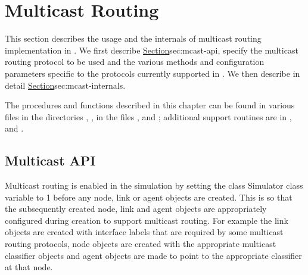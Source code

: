 \chapter{Multicast Routing}
\label{chap:multicast}

This section describes the usage and the internals of multicast
routing implementation in \ns.
We first describe 
\href{the user interface to enable multicast routing}{Section}{sec:mcast-api},
specify the multicast routing protocol to be used and the
various methods and configuration parameters specific to the
protocols currently supported in \ns.
We then describe in detail 
\href{the internals and the architecture of the
multicast routing implementation in \ns}{Section}{sec:mcast-internals}.

The procedures and functions described in this chapter can be found in
various files in the directories , ,
in the files , and ;
additional support routines
are in , and .

\section{Multicast API}
\label{sec:mcast-api}

Multicast routing is enabled in the simulation by setting 
the class Simulator class variable  to 1
before any node, link or agent objects are created.
This is so that the subsequently created 
node, link and agent objects are appropriately
configured during creation to support multicast routing.
For example the link objects are created with interface labels that
are required by some multicast routing protocols, 
node objects are created with the 
appropriate multicast classifier objects
and agent objects are made to point to the 
appropriate classifier at that node.

